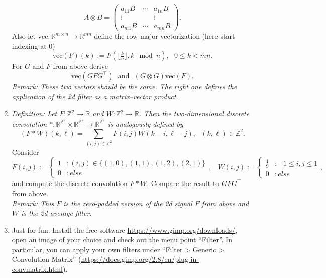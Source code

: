 \begin{enumerate}
{	 $$A \otimes B = \begin{pmatrix}
	 a_{11}B &\cdots& a_{1n} B \\
	 \vdots & &\vdots\\
	 a_{m1}B &\cdots& a_{mn} B
	 \end{pmatrix} .$$
 	 Also let $\text{vec}\colon \mathbb{R}^{m \times n} \to \mathbb{R}^{mn}$ define the row-major vectorization (here start indexing at $0$)
  	 $$\text{vec}(F)(k) := F(\lfloor\tfrac{k}{n}\rfloor, k \mod n),~~~0\leq k <mn.$$ }
   	For $G$ and $F$ from above derive 
   	$$\text{vec}(G F G^\top)~~~\text{and}~~~(G \otimes G)\text{vec}(F). $$
   	\textit{Remark: These two vectors should be the same. The right one defines the application of the 2d filter as a matrix--vector product.}
	\item \textit{\color{navy}Definition: Let $F\colon\mathbb{Z}^2\to\mathbb{R}$ and $W\colon\mathbb{Z}^2\to\mathbb{R}$. Then the two-dimensional discrete convolution $\ast\colon \mathbb{R}^{\mathbb{Z}^2}\times \mathbb{R}^{\mathbb{Z}^2}\to \mathbb{R}^{\mathbb{Z}^2}$ is analogously defined by 
		$$ (F \ast W)(k,\ell)  = \sum_{(i,j)\in \mathbb{Z}^2}F(i,j)W(k-i, \ell-j),~~~(k,\ell)\in\mathbb{Z}^2. $$}
	Consider 
	$$
	F(i,j) := \begin{cases}
	1 &: (i,j) \in \{(1,0),(1,1),(1,2), (2,1)\}\\
	0 &: else
	\end{cases},~~~~
	W(i,j) := \begin{cases}
	\tfrac{1}{9} &: -1\leq i,j \leq 1\\
	0 &: else
	\end{cases},
	$$
	and compute the discrete convolution $F \ast W$. Compare the result to $GFG^\top$ from above.\\
	\textit{Remark: This $F$ is the zero-padded version of the 2d signal $F$ from above and $W$ is the 2d average filter.}
	\item Just for fun: Install the free software \url{https://www.gimp.org/downloads/}, open an image of your choice and check out the menu point ``Filter''. In particular, you can apply your own filters under ``Filter > Generic > Convolution Matrix'' (\url{https://docs.gimp.org/2.8/en/plug-in-convmatrix.html}).
\end{enumerate}